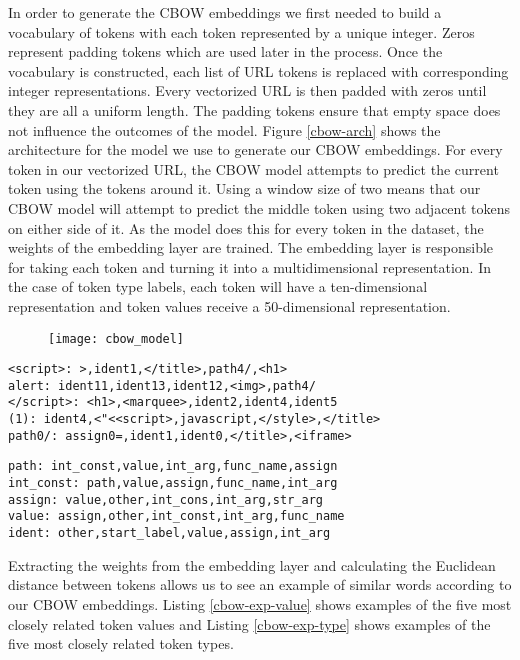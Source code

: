 In order to generate the CBOW embeddings we first needed to build a vocabulary of tokens with each token represented by a unique integer. Zeros represent padding tokens which are used later in the process.  Once the vocabulary is constructed, each list of URL tokens is replaced with corresponding integer representations.  Every vectorized URL is then padded with zeros until they are all a uniform length.  The padding tokens ensure that empty space does not influence the outcomes of the model.
Figure \ref{cbow-arch} shows the architecture for the model we use to generate our CBOW embeddings.  For every token in our vectorized URL, the CBOW model attempts to predict the current token using the tokens around it.  Using a window size of two means that our CBOW model will attempt to predict the middle token using two adjacent tokens on either side of it.  As the model does this for every token in the dataset, the weights of the embedding layer are trained.  The embedding layer is responsible for taking each token and turning it into a multidimensional representation.  In the case of token type labels, each token will have a ten-dimensional representation and token values receive a 50-dimensional representation.

\begin{figure}[H]
    \texttt{[image: cbow\_model]}
\end{figure} \label{cbow-arch}

\begin{lstlisting}[caption=Related token values, label=cbow-exp-value]
<script>: >,ident1,</title>,path4/,<h1>
alert: ident11,ident13,ident12,<img>,path4/
</script>: <h1>,<marquee>,ident2,ident4,ident5
(1): ident4,<"<<script>,javascript,</style>,</title>
path0/: assign0=,ident1,ident0,</title>,<iframe>  
\end{lstlisting}



\begin{lstlisting}[caption=Related token types, label=cbow-exp-type]
path: int_const,value,int_arg,func_name,assign
int_const: path,value,assign,func_name,int_arg
assign: value,other,int_cons,int_arg,str_arg
value: assign,other,int_const,int_arg,func_name
ident: other,start_label,value,assign,int_arg  
\end{lstlisting}

Extracting the weights from the embedding layer and calculating the Euclidean distance between tokens allows us to see an example of similar words according to our CBOW embeddings. Listing \ref{cbow-exp-value} shows examples of the five most closely related token values and Listing \ref{cbow-exp-type} shows examples of the five most closely related token types.

